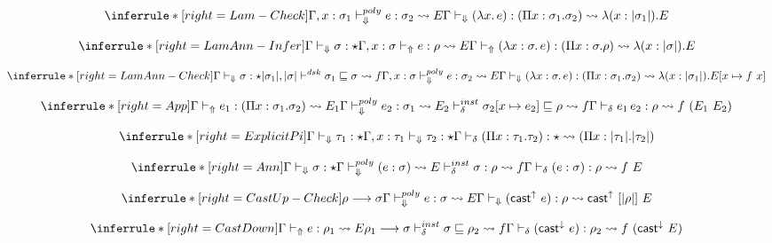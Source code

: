 \[
\inferrule*[right=Lam-Check]
{\Gamma,x: \sigma_1 \polycheckno e : \sigma_2 \transto{E}
} {\checktype (\lambda x.\, e) : (\Pi x: \sigma_1. \sigma_2) \transto{\lambda(x:\translated{\sigma_1}).E}}
\]

\[
\inferrule*[right=LamAnn-Infer]
{
\checktype \sigma:\star \\
\Gamma,x: \sigma \infertypeno e : \rho \transto{E}
} {\infertype (\lambda x:\sigma.\, e) : (\Pi x: \sigma. \rho) \transto{\lambda(x:\translated{\sigma}). E}}
\]

\[
\inferrule*[right=LamAnn-Check]
{
\checktype \sigma:\star \\
\translated{\sigma_1}, \translated{\sigma} \dsk \sigma_1 \sqsubseteq \sigma \transto{f} \\
\Gamma,x: \sigma \polycheckno e : \sigma_2 \transto{E} \\
}
{\checktype (\lambda x:\sigma.\, e) : (\Pi x: \sigma_1. \sigma_2) \transto{ \lambda(x:\translated{\sigma_1}). E[\tpmapsto \sigma x {f\ x}] }}
\]

\[
\inferrule*[right=App]
{\infertype e_1 : (\Pi x:\sigma_1. \sigma_2) \transto {E_1} \\
\polycheck e_2 : \sigma_1 \transto{E_2}\\
\instinfercheck \sigma_2 [\tpmapsto {\sigma_1} x e_2] \sqsubseteq \rho \transto{f}}
{\infercheck e_1\,e_2 : \rho \transto{f\ (E_1\ E_2)}}
\]

\[
\inferrule*[right=ExplicitPi]
{\checktype \tau_1 : \star \\ \Gamma, x:\tau_1 \checktypeno \tau_2 : \star }
{\infercheck (\Pi x:\tau_1. \tau_2) : \star \transto{(\Pi x:\translated{\tau_1}. \translated{\tau_2})}}
\]

\[
\inferrule*[right=Ann]
{
\checktype \sigma : \star \\
\polycheck (e:\sigma) \transto{E}\\
\instinfercheck \sigma : \rho \transto{f}}
{\infercheck (e : \sigma) : \rho \transto{f\ E}}
\]

\[
\inferrule*[right=CastUp-Check]
{ \rho \longrightarrow \sigma \\ \polycheck e : \sigma \transto{E} }
{\checktype (\castupe e) : \rho \transto{\castupe [\translated{\rho}]\ E}}
\]

\[
\inferrule*[right=CastDown]
{\infertype e : \rho_1 \transto{E}\\
\rho_1 \longrightarrow \sigma \\
\instinfercheck \sigma \sqsubseteq \rho_2\transto {f}}
{\infercheck (\castdowne e) : \rho_2 \transto {f\ (\castdowne E)}}
\]

